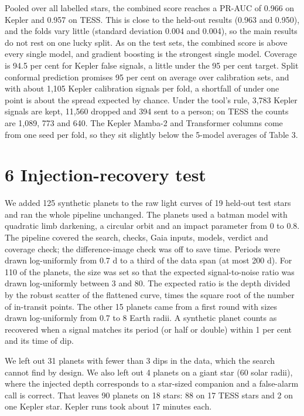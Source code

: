 \documentclass[
]{article}
\begin{document}
Pooled over all labelled stars, the combined score reaches a PR-AUC of
0.966 on Kepler and 0.957 on TESS. This is close to the held-out results
(0.963 and 0.950), and the folds vary little (standard deviation 0.004
and 0.004), so the main results do not rest on one lucky split. As on
the test sets, the combined score is above every single model, and
gradient boosting is the strongest single model. Coverage is 94.5 per
cent for Kepler false signals, a little under the 95 per cent target.
Split conformal prediction promises 95 per cent on average over
calibration sets, and with about 1,105 Kepler calibration signals per
fold, a shortfall of under one point is about the spread expected by
chance. Under the tool's rule, 3,783 Kepler signals are kept, 11,560
dropped and 394 sent to a person; on TESS the counts are 1,089, 773 and
640. The Kepler Mamba-2 and Transformer columns come from one seed per
fold, so they sit slightly below the 5-model averages of Table 3.

\hypertarget{injection-recovery-test}{%
\section{6 Injection-recovery test}\label{injection-recovery-test}}

We added 125 synthetic planets to the raw light curves of 19 held-out
test stars and ran the whole pipeline unchanged. The planets used a
batman model with quadratic limb darkening, a circular orbit and an
impact parameter from 0 to 0.8. The pipeline covered the search, checks,
Gaia inputs, models, verdict and coverage check; the difference-image
check was off to save time. Periods were drawn log-uniformly from 0.7 d
to a third of the data span (at most 200 d). For 110 of the planets, the
size was set so that the expected signal-to-noise ratio was drawn
log-uniformly between 3 and 80. The expected ratio is the depth divided
by the robust scatter of the flattened curve, times the square root of
the number of in-transit points. The other 15 planets came from a first
round with sizes drawn log-uniformly from 0.7 to 8 Earth radii. A
synthetic planet counts as recovered when a signal matches its period
(or half or double) within 1 per cent and its time of dip.

We left out 31 planets with fewer than 3 dips in the data, which the
search cannot find by design. We also left out 4 planets on a giant star
(60 solar radii), where the injected depth corresponds to a star-sized
companion and a false-alarm call is correct. That leaves 90 planets on
18 stars: 88 on 17 TESS stars and 2 on one Kepler star. Kepler runs took
about 17 minutes each.
\end{document}
